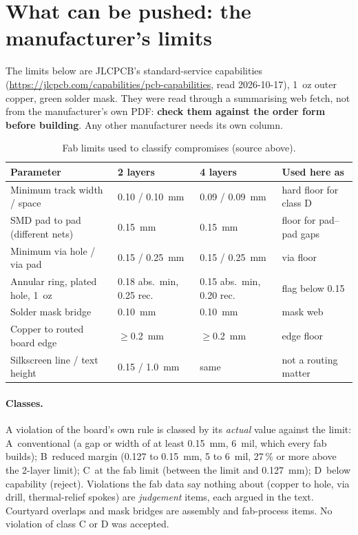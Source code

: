 \documentclass[10pt,a4paper]{article}
\newcommand{\cls}[1]{\textsc{#1}}
\begin{document}
\section{What can be pushed: the manufacturer's limits}\label{sec:fab}

The limits below are JLCPCB's standard-service capabilities (\url{https://jlcpcb.com/capabilities/pcb-capabilities}, read 2026-10-17), 1~oz outer copper, green solder mask. They were read through a summarising web fetch,
not from the manufacturer's own PDF: \textbf{check them against the order form before building}. Any other manufacturer needs its own column.

\begin{table}[H]\centering\small
\begin{tabular}{p{5.2cm}p{2.4cm}p{2.4cm}p{3.6cm}}
\toprule
Parameter & 2 layers & 4 layers & Used here as \\
\midrule
Minimum track width / space & 0.10 / 0.10~mm & 0.09 / 0.09~mm & hard floor for class D\\
SMD pad to pad (different nets) & 0.15~mm & 0.15~mm & floor for pad--pad gaps\\
Minimum via hole / via pad & 0.15 / 0.25~mm & 0.15 / 0.25~mm & via floor\\
Annular ring, plated hole, 1~oz & 0.18 abs.\ min, 0.25 rec. & 0.15 abs.\ min, 0.20 rec. & flag below 0.15\\
Solder mask bridge & 0.10~mm & 0.10~mm & mask web\\
Copper to routed board edge & $\geq$0.2~mm & $\geq$0.2~mm & edge floor\\
Silkscreen line / text height & 0.15 / 1.0~mm & same & not a routing matter\\
\bottomrule
\end{tabular}
\caption{Fab limits used to classify compromises (source above).}
\end{table}

\paragraph{Classes.} A violation of the board's own rule is classed by its \emph{actual} value against the limit: \cls{A}~conventional (a gap or width of at least 0.15~mm, 6~mil, which every fab builds);
\cls{B}~reduced margin (0.127 to 0.15~mm, 5 to 6~mil, 27\,\% or more above the 2-layer limit); \cls{C}~at the fab limit (between the limit and 0.127~mm); \cls{D}~below capability (reject).
Violations the fab data say nothing about (copper to hole, via drill, thermal-relief spokes) are \emph{judgement} items, each argued in the text. Courtyard overlaps and mask bridges are assembly and fab-process items.
No violation of class C or D was accepted.
\end{document}
